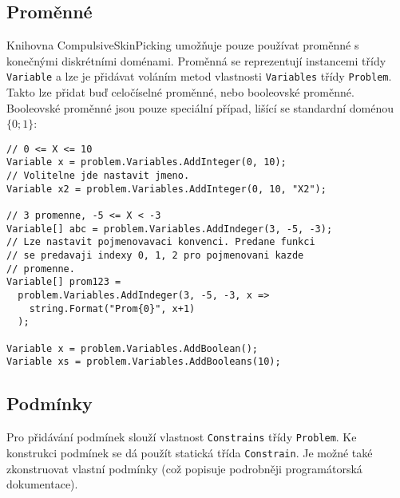 \documentclass[a4paper]{article}
\begin{document}
\subsection{Proměnné}
Knihovna CompulsiveSkinPicking umožňuje pouze používat proměnné s konečnými
diskrétními doménami. Proměnná se reprezentují instancemi třídy
\texttt{Variable} a lze je přidávat voláním metod vlastnosti \texttt{Variables}
třídy \texttt{Problem}. Takto lze přidat buď celočíselné proměnné, nebo
booleovské proměnné. Booleovské proměnné jsou pouze speciální případ, lišící se
standardní doménou $\{0;1\}$:
\begin{lstlisting}
// 0 <= X <= 10
Variable x = problem.Variables.AddInteger(0, 10);
// Volitelne jde nastavit jmeno.
Variable x2 = problem.Variables.AddInteger(0, 10, "X2");

// 3 promenne, -5 <= X < -3
Variable[] abc = problem.Variables.AddIndeger(3, -5, -3);
// Lze nastavit pojmenovavaci konvenci. Predane funkci
// se predavaji indexy 0, 1, 2 pro pojmenovani kazde
// promenne.
Variable[] prom123 =
  problem.Variables.AddIndeger(3, -5, -3, x =>
    string.Format("Prom{0}", x+1)
  );

Variable x = problem.Variables.AddBoolean();
Variable xs = problem.Variables.AddBooleans(10);
\end{lstlisting}

\subsection{Podmínky}
Pro přidávání podmínek slouží vlastnost \texttt{Constrains} třídy
\texttt{Problem}. Ke konstrukci podmínek se dá použít statická třída
\texttt{Constrain}. Je možné také zkonstruovat vlastní podmínky (což popisuje
podrobněji programátorská dokumentace).
\end{document}
